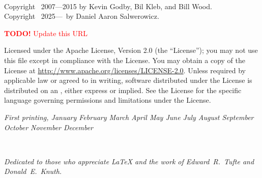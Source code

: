 \documentclass[a4paper]{tufte-book}
\newcommand{\monthyear}{%
  \ifcase\month%
    \or January%
    \or February%
    \or March%
    \or April%
    \or May%
    \or June%
    \or July%
    \or August%
    \or September%
    \or October%
    \or November%
    \or December%
  \fi\space\number\year
}
\newcommand{\TODO}[1]{\textcolor{red}{\textbf{TODO!} #1}\xspace}
\begin{document}
\newpage
\begin{fullwidth}
~\vfill
\thispagestyle{empty}
\setlength{\parindent}{0pt}
\setlength{\parskip}{\baselineskip}

Copyright \textcopyright\ 2007---2015 by Kevin Godby, Bil Kleb, and Bill Wood.\\
Copyright \textcopyright\ 2025---\the\year\ by Daniel Aaron Salwerowicz.

\par{}

\TODO{Update this URL}
\par{} %

\par
Licensed under the Apache License, Version 2.0 (the ``License''); you may not
use this file except in compliance with the License. You may obtain a copy
of the License at \url{http://www.apache.org/licenses/LICENSE-2.0}. Unless
required by applicable law or agreed to in writing, software distributed
under the License is distributed on an , either express or implied. See the
License for the specific language governing permissions and limitations
under the License.

\par\textit{First printing, \monthyear}
\end{fullwidth}


\tableofcontents


\listoffigures


\listoftables


\cleardoublepage
~\vfill
\begin{doublespace}
  \noindent\fontsize{18}{22}\selectfont\itshape\nohyphenation
  Dedicated to those who appreciate \LaTeX{} and the work of 
  \mbox{Edward R.~Tufte} and \mbox{Donald E.~Knuth}.
\end{doublespace}
\end{document}
